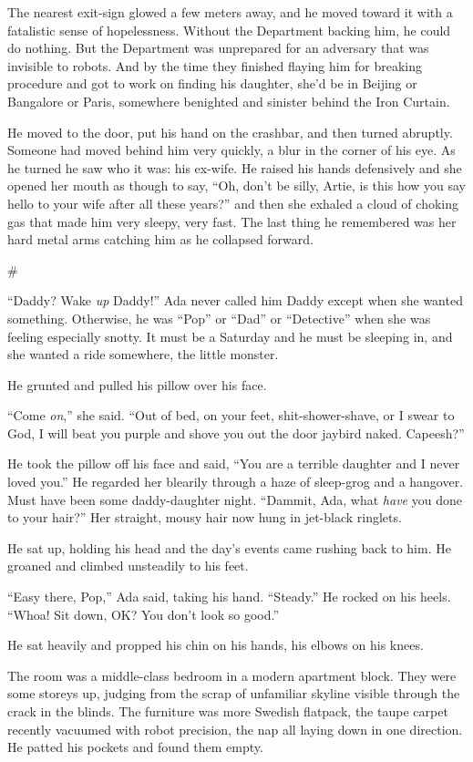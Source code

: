 The nearest exit-sign glowed a few meters away, and he moved toward
it with a fatalistic sense of hopelessness. Without the Department
backing him, he could do nothing. But the Department was unprepared
for an adversary that was invisible to robots. And by the time they
finished flaying him for breaking procedure and got to work on
finding his daughter, she’d be in Beijing or Bangalore or Paris,
somewhere benighted and sinister behind the Iron Curtain.

He moved to the door, put his hand on the crashbar, and then turned
abruptly. Someone had moved behind him very quickly, a blur in the
corner of his eye. As he turned he saw who it was: his ex-wife. He
raised his hands defensively and she opened her mouth as though to
say, “Oh, don’t be silly, Artie, is this how you say hello to your
wife after all these years?” and then she exhaled a cloud of
choking gas that made him very sleepy, very fast. The last thing he
remembered was her hard metal arms catching him as he collapsed
forward.

\#

“Daddy? Wake \emph{up} Daddy!” Ada never called him Daddy except
when she wanted something. Otherwise, he was “Pop” or “Dad” or
“Detective” when she was feeling especially snotty. It must be a
Saturday and he must be sleeping in, and she wanted a ride
somewhere, the little monster.

He grunted and pulled his pillow over his face.

“Come \emph{on},” she said. “Out of bed, on your feet,
shit-shower-shave, or I swear to God, I will beat you purple and
shove you out the door jaybird naked. Capeesh?”

He took the pillow off his face and said, “You are a terrible
daughter and I never loved you.” He regarded her blearily through a
haze of sleep-grog and a hangover. Must have been some
daddy-daughter night. “Dammit, Ada, what \emph{have} you done to
your hair?” Her straight, mousy hair now hung in jet-black
ringlets.

He sat up, holding his head and the day’s events came rushing back
to him. He groaned and climbed unsteadily to his feet.

“Easy there, Pop,” Ada said, taking his hand. “Steady.” He rocked
on his heels. “Whoa! Sit down, OK? You don’t look so good.”

He sat heavily and propped his chin on his hands, his elbows on his
knees.

The room was a middle-class bedroom in a modern apartment block.
They were some storeys up, judging from the scrap of unfamiliar
skyline visible through the crack in the blinds. The furniture was
more Swedish flatpack, the taupe carpet recently vacuumed with
robot precision, the nap all laying down in one direction. He
patted his pockets and found them empty.


